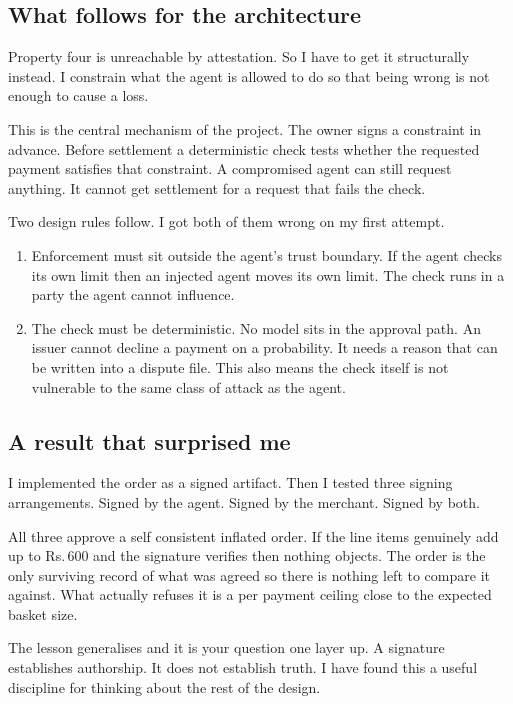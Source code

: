 \documentclass[journal,onecolumn,11pt]{IEEEtran}
\newcommand{\rs}{Rs.\,}
\begin{document}
\subsection{What follows for the architecture}
Property four is unreachable by attestation. So I have to get it structurally instead. I
constrain what the agent is allowed to do so that being wrong is not enough to cause a
loss.

This is the central mechanism of the project. The owner signs a constraint in advance.
Before settlement a deterministic check tests whether the requested payment satisfies
that constraint. A compromised agent can still request anything. It cannot get settlement
for a request that fails the check.

Two design rules follow. I got both of them wrong on my first attempt.

\begin{enumerate}[leftmargin=*]
\item Enforcement must sit outside the agent's trust boundary. If the agent checks its
own limit then an injected agent moves its own limit. The check runs in a party the agent
cannot influence.
\item The check must be deterministic. No model sits in the approval path. An issuer
cannot decline a payment on a probability. It needs a reason that can be written into a
dispute file. This also means the check itself is not vulnerable to the same class of
attack as the agent.
\end{enumerate}

\subsection{A result that surprised me}
I implemented the order as a signed artifact. Then I tested three signing arrangements.
Signed by the agent. Signed by the merchant. Signed by both.

All three approve a self consistent inflated order. If the line items genuinely add up to
\rs 600 and the signature verifies then nothing objects. The order is the only surviving
record of what was agreed so there is nothing left to compare it against. What actually
refuses it is a per payment ceiling close to the expected basket size.

The lesson generalises and it is your question one layer up. A signature establishes
authorship. It does not establish truth. I have found this a useful discipline for
thinking about the rest of the design.
\end{document}
